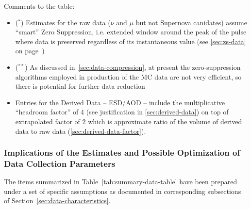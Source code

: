 Comments to the table:
\begin{itemize}
\item ($^*$) Estimates for the raw data ($\nu$ and $\mu$ but not Supernova canidates) assume ``smart'' Zero Suppression, i.e. extended
window around the peak of the pulse where data is preserved regardless of its instantaneous value (see \ref{sec:zs-data} on page~\pageref{sec:zs-data})

\item ($^{**}$) As discussed in~\ref{sec:data-compression}, at present the zero-suppression algorithms employed in production of the
MC data are not very efficient, so there is potential for further data reduction

\item Entries for the Derived Data -- ESD/AOD --  include the multiplicative ``headroom factor'' of 4 (see justification in \ref{sec:derived-data})
on top of extrapolated factor of 2 which is approximate ratio of the volume of derived data to raw data (\ref{sec:derived-data-factor}).
\end{itemize}

\subsubsection{Implications of the Estimates and Possible Optimization of Data Collection Parameters}
The items summarized in Table~\ref{tab:summary-data-table} have been prepared under a set of specific
assumptions as documented in corresponding subsections of Section~\ref{sec:data-characteristics}.

